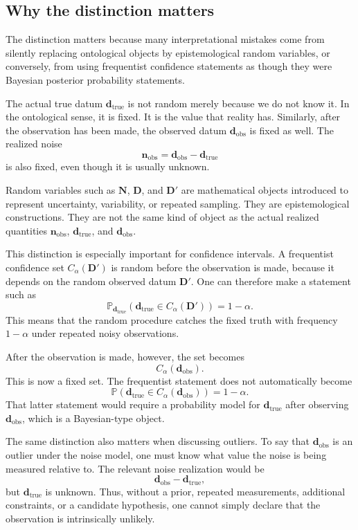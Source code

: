 \documentclass[11pt]{article}
\newcommand{\Drand}{\mathbf D}
\newcommand{\Dobsrand}{\mathbf D'}
\newcommand{\Nrand}{\mathbf N}
\newcommand{\dtrue}{\mathbf d_{\mathrm{true}}}
\newcommand{\dobs}{\mathbf d_{\mathrm{obs}}}
\newcommand{\nobs}{\mathbf n_{\mathrm{obs}}}
\newcommand{\Calpha}{C_{\alpha}}
\newcommand{\Prob}{\mathbb P}
\begin{document}
\subsection{Why the distinction matters}

The distinction matters because many interpretational mistakes come from silently replacing ontological objects by epistemological random variables, or conversely, from using frequentist confidence statements as though they were Bayesian posterior probability statements.

The actual true datum \(\dtrue\) is not random merely because we do not know it. In the ontological sense, it is fixed. It is the value that reality has. Similarly, after the observation has been made, the observed datum \(\dobs\) is fixed as well. The realized noise
\[
    \nobs=\dobs-\dtrue
\]
is also fixed, even though it is usually unknown.

Random variables such as \(\Nrand\), \(\Drand\), and \(\Dobsrand\) are mathematical objects introduced to represent uncertainty, variability, or repeated sampling. They are epistemological constructions. They are not the same kind of object as the actual realized quantities \(\nobs\), \(\dtrue\), and \(\dobs\).

This distinction is especially important for confidence intervals. A frequentist confidence set \(\Calpha(\Dobsrand)\) is random before the observation is made, because it depends on the random observed datum \(\Dobsrand\). One can therefore make a statement such as
\[
    \Prob_{\dtrue}
    \left(
        \dtrue\in\Calpha(\Dobsrand)
    \right)
    =
    1-\alpha.
\]
This means that the random procedure catches the fixed truth with frequency \(1-\alpha\) under repeated noisy observations.

After the observation is made, however, the set becomes
\[
    \Calpha(\dobs).
\]
This is now a fixed set. The frequentist statement does not automatically become
\[
    \Prob
    \left(
        \dtrue\in\Calpha(\dobs)
    \right)
    =
    1-\alpha.
\]
That latter statement would require a probability model for \(\dtrue\) after observing \(\dobs\), which is a Bayesian-type object.

The same distinction also matters when discussing outliers. To say that \(\dobs\) is an outlier under the noise model, one must know what value the noise is being measured relative to. The relevant noise realization would be
\[
    \dobs-\dtrue,
\]
but \(\dtrue\) is unknown. Thus, without a prior, repeated measurements, additional constraints, or a candidate hypothesis, one cannot simply declare that the observation is intrinsically unlikely.
\end{document}
